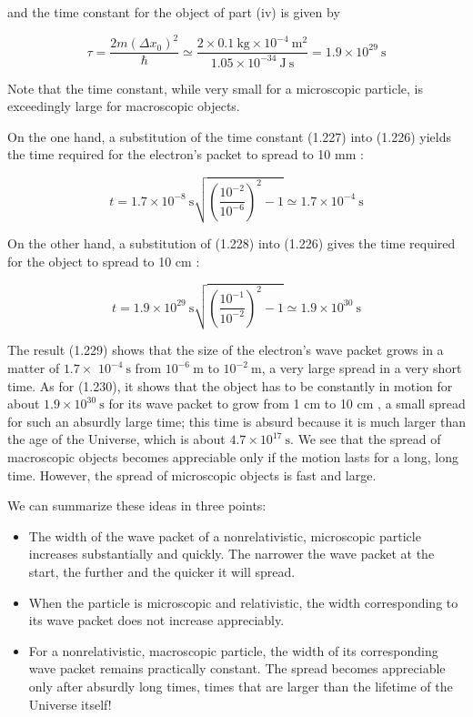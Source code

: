 \documentclass[10pt]{article}
\begin{document}
and the time constant for the object of part (iv) is given by


\begin{equation*}
\tau=\frac{2 m\left(\Delta x_{0}\right)^{2}}{\hbar} \simeq \frac{2 \times 0.1 \mathrm{~kg} \times 10^{-4} \mathrm{~m}^{2}}{1.05 \times 10^{-34} \mathrm{~J} \mathrm{~s}}=1.9 \times 10^{29} \mathrm{~s} \tag{1.228}
\end{equation*}


Note that the time constant, while very small for a microscopic particle, is exceedingly large for macroscopic objects.

On the one hand, a substitution of the time constant (1.227) into (1.226) yields the time required for the electron's packet to spread to 10 mm :


\begin{equation*}
t=1.7 \times 10^{-8} \mathrm{~s} \sqrt{\left(\frac{10^{-2}}{10^{-6}}\right)^{2}-1} \simeq 1.7 \times 10^{-4} \mathrm{~s} \tag{1.229}
\end{equation*}


On the other hand, a substitution of (1.228) into (1.226) gives the time required for the object to spread to 10 cm :


\begin{equation*}
t=1.9 \times 10^{29} \mathrm{~s} \sqrt{\left(\frac{10^{-1}}{10^{-2}}\right)^{2}-1} \simeq 1.9 \times 10^{30} \mathrm{~s} \tag{1.230}
\end{equation*}


The result (1.229) shows that the size of the electron's wave packet grows in a matter of $1.7 \times$ $10^{-4} \mathrm{~s}$ from $10^{-6} \mathrm{~m}$ to $10^{-2} \mathrm{~m}$, a very large spread in a very short time. As for (1.230), it shows that the object has to be constantly in motion for about $1.9 \times 10^{30} \mathrm{~s}$ for its wave packet to grow from 1 cm to 10 cm , a small spread for such an absurdly large time; this time is absurd because it is much larger than the age of the Universe, which is about $4.7 \times 10^{17} \mathrm{~s}$. We see that the spread of macroscopic objects becomes appreciable only if the motion lasts for a long, long time. However, the spread of microscopic objects is fast and large.

We can summarize these ideas in three points:

\begin{itemize}
  \item The width of the wave packet of a nonrelativistic, microscopic particle increases substantially and quickly. The narrower the wave packet at the start, the further and the quicker it will spread.
  \item When the particle is microscopic and relativistic, the width corresponding to its wave packet does not increase appreciably.
  \item For a nonrelativistic, macroscopic particle, the width of its corresponding wave packet remains practically constant. The spread becomes appreciable only after absurdly long times, times that are larger than the lifetime of the Universe itself!
\end{itemize}
\end{document}
